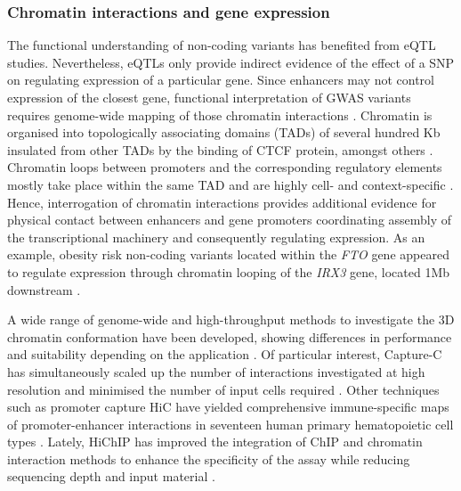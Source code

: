 \subsubsection{Chromatin interactions and gene expression}
The functional understanding of non-coding variants has benefited from eQTL studies. Nevertheless, eQTLs only provide indirect evidence of the effect of a SNP on regulating expression of a particular gene. Since enhancers may not control expression of the closest gene, functional interpretation of GWAS variants requires genome-wide mapping of those chromatin interactions \parencite{Smemo2014}.  Chromatin is organised into topologically associating domains (TADs) of several hundred Kb insulated from other TADs by the binding of CTCF protein, amongst others \parencite{Nora2017}. Chromatin loops between promoters and the corresponding regulatory elements mostly take place within the same TAD and are highly cell- and context-specific \parencite{Smith2016}. Hence, interrogation of chromatin interactions provides additional evidence for physical contact between enhancers and gene promoters coordinating assembly of the transcriptional machinery and consequently regulating expression. As an example, obesity risk non-coding variants located within the \textit{FTO} gene appeared to regulate expression through chromatin looping of the \textit{IRX3} gene, located 1Mb downstream \parencite{Smemo2014}.

A wide range of genome-wide and high-throughput methods to investigate the 3D chromatin conformation have been developed, showing differences in performance and suitability depending on the application \parencite{Davies2017}. Of particular interest, Capture-C has simultaneously scaled up the number of interactions investigated at high resolution and minimised the number of input cells required \parencite{Davies2016,Oudelaar2017}. Other techniques such as promoter capture HiC have yielded comprehensive immune-specific maps of promoter-enhancer interactions in seventeen human primary hematopoietic cell types \parencite{Javierre2016}. Lately, HiChIP has improved the integration of ChIP and chromatin interaction methods to enhance the specificity of the assay while reducing sequencing depth and input material \parencite{Mumbach2016}. 



